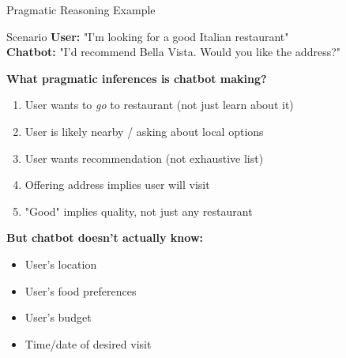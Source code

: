 \documentclass[aspectratio=169]{beamer}
\begin{document}
\begin{frame}[shrink=10]{Pragmatic Reasoning Example 🧩}
\small
    \begin{block}{Scenario}
        \textbf{User:} "I'm looking for a good Italian restaurant" \\
        \textbf{Chatbot:} "I'd recommend Bella Vista. Would you like the address?"
    \end{block}

    \vspace{0.3cm}

    \textbf{What pragmatic inferences is chatbot making?}

    \begin{enumerate}\setlength{\itemsep}{0pt}
        \item User wants to \textit{go} to restaurant (not just learn about it)
        \item User is likely nearby / asking about local options
        \item User wants recommendation (not exhaustive list)
        \item Offering address implies user will visit
        \item "Good" implies quality, not just any restaurant
    \end{enumerate}

    \vspace{0.3cm}

    \textbf{But chatbot doesn't actually know:}
    \begin{itemize}\setlength{\itemsep}{0pt}
        \item User's location
        \item User's food preferences
        \item User's budget
        \item Time/date of desired visit
    \end{itemize}
\end{frame}
\end{document}
